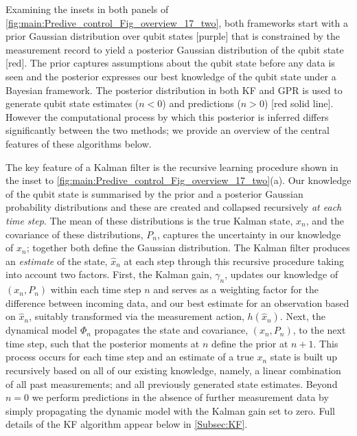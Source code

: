 Examining the insets in both panels of \cref{fig:main:Predive_control_Fig_overview_17_two}, both frameworks start with a prior Gaussian distribution over qubit states [purple] that is constrained by the measurement record to yield a posterior Gaussian distribution of the qubit state [red]. The prior captures assumptions about the qubit state before any data is seen and the posterior expresses our best knowledge of the qubit state under a Bayesian framework.  The posterior distribution in both KF and GPR is used to generate qubit state estimates ($n<0$) and predictions ($n>0$) [red solid line].  However the computational process by which this posterior is inferred differs significantly between the two methods; we provide an overview of the central features of these algorithms below. 

The key feature of a Kalman filter is the recursive learning procedure shown in the inset to \cref{fig:main:Predive_control_Fig_overview_17_two}(a). Our knowledge of the qubit state is summarised by the prior and a posterior Gaussian probability distributions and these are created and collapsed recursively \emph{at each time step}. The mean of these distributions is the true Kalman state, $x_n$, and the covariance of these distributions, $P_n$, captures the uncertainty in our knowledge of $x_n$; together both  define the Gaussian distribution. The Kalman filter produces an \emph{estimate} of the state, $\hat{x}_{n}$ at each step through this recursive procedure taking into account two factors. First, the Kalman gain, $\gamma_n$, updates our knowledge of $(x_n, P_n)$ within each time step $n$ and serves as a weighting factor for the difference between  incoming data, and our best estimate for an observation based on $\hat{x}_n$, suitably transformed via the measurement action, $h(\hat{x}_{n})$. Next, the dynamical model $\Phi_n$ propagates the state and covariance, $(x_n, P_n)$, to the next time step, such that the posterior moments at $n$ define the prior at $n+1$.  This process occurs for each time step and an estimate of a true $x_n$ state is built up recursively based on all of our existing knowledge, namely, a linear combination of all past measurements; and all previously generated state estimates.  Beyond $n=0$ we perform predictions in the absence of further measurement data by simply propagating the dynamic model with the Kalman gain set to zero.  Full details of the KF algorithm appear below in \cref{Subsec:KF}.

